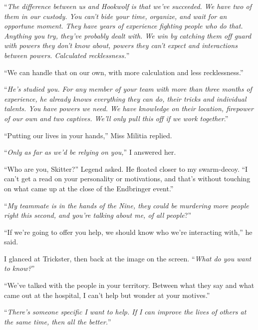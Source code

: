 ``\emph{The difference between us and Hookwolf is that we've succeeded.  We have two of them in our custody.  You can't bide your time, organize, and wait for an opportune moment.  They have years of experience fighting people who do that.  Anything you try, they've probably dealt with.  We win by catching them off guard with powers they don't know about, powers they can't expect and interactions between powers.  Calculated recklessness.}''



``We can handle that on our own, with more calculation and less recklessness.''



``\emph{He's studied you.  For any member of your team with more than three months of experience, he already knows everything they can do, their tricks and individual talents.  You have powers we need.  We have knowledge on their location, firepower of our own and two captives.  We'll only pull this off if we work together}.''



``Putting our lives in your hands,'' Miss Militia replied.



``\emph{Only as far as we'd be relying on you,}'' I answered her.



``Who are you, Skitter?''  Legend asked.  He floated closer to my swarm-decoy.  ``I can't get a read on your personality or motivations, and that's without touching on what came up at the close of the Endbringer event.''



``\emph{My teammate is in the hands of the Nine, they could be murdering more people right this second, and you're talking about me, of all people}?''



``If we're going to offer you help, we should know who we're interacting with,'' he said.



I glanced at Trickster, then back at the image on the screen.  ``\emph{What do you want to know?}''



``We've talked with the people in your territory.  Between what they say and what came out at the hospital, I can't help but wonder at your motives.''



``\emph{There's someone specific I want to help.  If I can improve the lives of others at the same time, then all the better.}''



